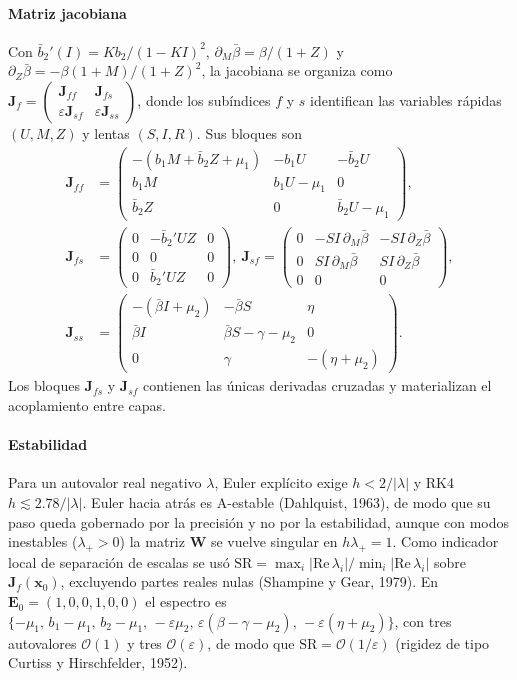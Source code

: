\paragraph{Matriz jacobiana} Con $\bar b_2'(I)=Kb_2/(1-KI)^2$, $\partial_M\bar\beta=\beta/(1+Z)$ y $\partial_Z\bar\beta=-\beta(1+M)/(1+Z)^2$, la jacobiana se organiza como $\mathbf J_f=\begin{pmatrix}\mathbf J_{ff}&\mathbf J_{fs}\\ \varepsilon\mathbf J_{sf}&\varepsilon\mathbf J_{ss}\end{pmatrix}$, donde los subíndices $f$ y $s$ identifican las variables rápidas $(U,M,Z)$ y lentas $(S,I,R)$. Sus bloques son
{\scriptsize\setlength{\arraycolsep}{2pt}
\begin{align*}
\mathbf J_{ff}&=\begin{pmatrix}-(b_1M+\bar b_2Z+\mu_1)&-b_1U&-\bar b_2U\\ b_1M&b_1U-\mu_1&0\\ \bar b_2Z&0&\bar b_2U-\mu_1\end{pmatrix},\\
\mathbf J_{fs}&=\begin{pmatrix}0&-\bar b_2'UZ&0\\0&0&0\\0&\bar b_2'UZ&0\end{pmatrix},\
\mathbf J_{sf}=\begin{pmatrix}0&-SI\,\partial_M\bar\beta&-SI\,\partial_Z\bar\beta\\0&SI\,\partial_M\bar\beta&SI\,\partial_Z\bar\beta\\0&0&0\end{pmatrix},\\
\mathbf J_{ss}&=\begin{pmatrix}-(\bar\beta I+\mu_2)&-\bar\beta S&\eta\\ \bar\beta I&\bar\beta S-\gamma-\mu_2&0\\0&\gamma&-(\eta+\mu_2)\end{pmatrix}.
\end{align*}}
Los bloques $\mathbf J_{fs}$ y $\mathbf J_{sf}$ contienen las únicas derivadas cruzadas y materializan el acoplamiento entre capas.

\paragraph{Estabilidad} Para un autovalor real negativo $\lambda$, Euler explícito exige $h<2/|\lambda|$ y RK4 $h\lesssim2.78/|\lambda|$. Euler hacia atrás es A-estable (Dahlquist, 1963), de modo que su paso queda gobernado por la precisión y no por la estabilidad, aunque con modos inestables ($\lambda_+>0$) la matriz $\mathbf W$ se vuelve singular en $h\lambda_+=1$. Como indicador local de separación de escalas se usó $\mathrm{SR}=\max_i|\mathrm{Re}\,\lambda_i|/\min_i|\mathrm{Re}\,\lambda_i|$ sobre $\mathbf J_f(\mathbf x_0)$, excluyendo partes reales nulas (Shampine y Gear, 1979). En $\mathbf E_0=(1,0,0,1,0,0)$ el espectro es $\{-\mu_1,\,b_1-\mu_1,\,b_2-\mu_1,\,-\varepsilon\mu_2,\,\varepsilon(\beta-\gamma-\mu_2),\,-\varepsilon(\eta+\mu_2)\}$, con tres autovalores $\mathcal O(1)$ y tres $\mathcal O(\varepsilon)$, de modo que $\mathrm{SR}=\mathcal O(1/\varepsilon)$ (rigidez de tipo Curtiss y Hirschfelder, 1952).

